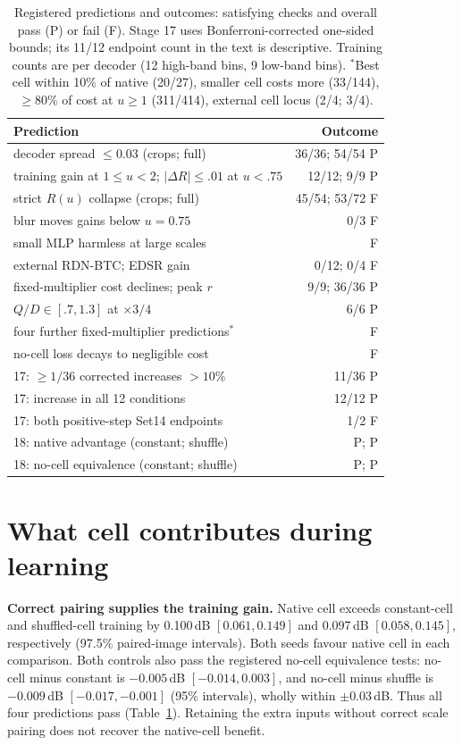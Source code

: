 \documentclass{article}
\begin{document}
\begin{table}[t]\centering\footnotesize
\caption{Registered predictions and outcomes: satisfying checks and overall pass (P) or fail (F). Stage 17 uses Bonferroni-corrected one-sided bounds; its 11/12 endpoint count in the text is descriptive. Training counts are per decoder (12 high-band bins, 9 low-band bins). $^*$Best cell within 10\% of native (20/27), smaller cell costs more (33/144), $\ge80\%$ of cost at $u\ge1$ (311/414), external cell locus (2/4; 3/4).}
\label{tab:gates}
\begin{tabular}{p{5.0cm}r}\toprule
Prediction & Outcome\\\midrule
decoder spread $\le0.03$ (crops; full) & 36/36; 54/54 P\\
training gain at $1{\le}u{<}2$; $|\Delta R|{\le}.01$ at $u{<}.75$ & 12/12; 9/9 P\\
strict $R(u)$ collapse (crops; full) & 45/54; 53/72 F\\
blur moves gains below $u=0.75$ & 0/3 F\\
small MLP harmless at large scales & F\\
external RDN-BTC; EDSR gain & 0/12; 0/4 F\\
fixed-multiplier cost declines; peak $r$ & 9/9; 36/36 P\\
$Q/D\in[.7,1.3]$ at $\times3/4$ & 6/6 P\\
four further fixed-multiplier predictions$^*$ & F\\
no-cell loss decays to negligible cost & F\\\midrule
17: $\ge1/36$ corrected increases $>10\%$ & 11/36 P\\
17: increase in all 12 conditions & 12/12 P\\
17: both positive-step Set14 endpoints & 1/2 F\\
18: native advantage (constant; shuffle) & P; P\\
18: no-cell equivalence (constant; shuffle) & P; P\\\bottomrule
\end{tabular}
\end{table}

\section{What cell contributes during learning}
\label{sec:training}
\textbf{Correct pairing supplies the training gain.} Native cell exceeds constant-cell and shuffled-cell training by 0.100\,dB $[0.061,0.149]$ and 0.097\,dB $[0.058,0.145]$, respectively (97.5\% paired-image intervals). Both seeds favour native cell in each comparison. Both controls also pass the registered no-cell equivalence tests: no-cell minus constant is $-0.005$\,dB $[-0.014,0.003]$, and no-cell minus shuffle is $-0.009$\,dB $[-0.017,-0.001]$ (95\% intervals), wholly within $\pm0.03$\,dB. Thus all four predictions pass (Table~\ref{tab:gates}). Retaining the extra inputs without correct scale pairing does not recover the native-cell benefit.
\end{document}
